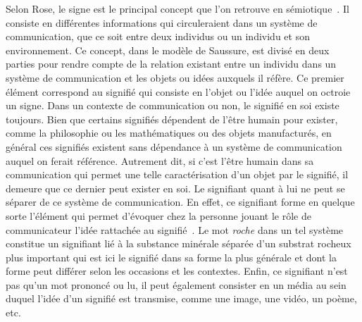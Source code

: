 Selon Rose, le signe est le principal concept que l'on retrouve en sémiotique~\citeyearpar[74]{Rose2001}.
Il consiste en différentes informations qui circuleraient dans un système de communication, que ce soit entre deux individus ou un individu et son environnement.
Ce concept, dans le modèle de Saussure, est divisé en deux parties pour rendre compte de la relation existant entre un individu dans un système de communication et les objets ou idées auxquels il réfère.
Ce premier élément correspond au signifié qui consiste en l'objet ou l'idée auquel on octroie un signe.
Dans un contexte de communication ou non, le signifié en soi existe toujours.
Bien que certains signifiés dépendent de l'être humain pour exister, comme la philosophie ou les mathématiques ou des objets manufacturés, en général ces signifiés existent sans dépendance à un système de communication auquel on ferait référence.
Autrement dit, si c'est l'être humain dans sa communication qui permet une telle caractérisation d'un objet par le signifié, il demeure que ce dernier peut exister en soi.
Le signifiant quant à lui ne peut se séparer de ce système de communication.
En effet, ce signifiant forme en quelque sorte l'élément qui permet d'évoquer chez la personne jouant le rôle de communicateur l'idée rattachée au signifié~\citeyearpar[74]{Rose2001}.
Le mot \emph{roche} dans un tel système constitue un signifiant lié à la substance minérale séparée d'un substrat rocheux plus important qui est ici le signifié dans sa forme la plus générale et dont la forme peut différer selon les occasions et les contextes.
Enfin, ce signifiant n'est pas qu'un mot prononcé ou lu, il peut également consister en un média au sein duquel l'idée d'un signifié est transmise, comme une image, une vidéo, un poème, etc.

